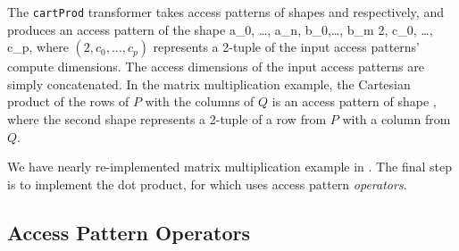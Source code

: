 The \texttt{cartProd} transformer
  takes access patterns
  of shapes
  and 
  respectively, and produces 
  an access pattern of the shape
  \accesspatternshape
    {a_0, \dots, a_n, b_0,\dots, b_m}
    {2, c_0, \dots, c_p},
  where $(2, c_0, \dots, c_p)$
  represents a 2-tuple
  of the input access patterns'
  compute dimensions.
The access dimensions
  of the input access patterns
  are simply concatenated.
In the matrix multiplication example,
  the Cartesian product
  of the rows of $P$
  with the columns of $Q$
  is an access pattern
  of shape
  ,
  where the second shape
  represents a 2-tuple
  of a row from $P$
  with a column from $Q$.

We have nearly re-implemented
  matrix multiplication example
  in \g.
The final step
  is to implement the dot product, for which
  \g uses 
  access pattern \textit{operators}.
  
\subsection{Access Pattern Operators}

